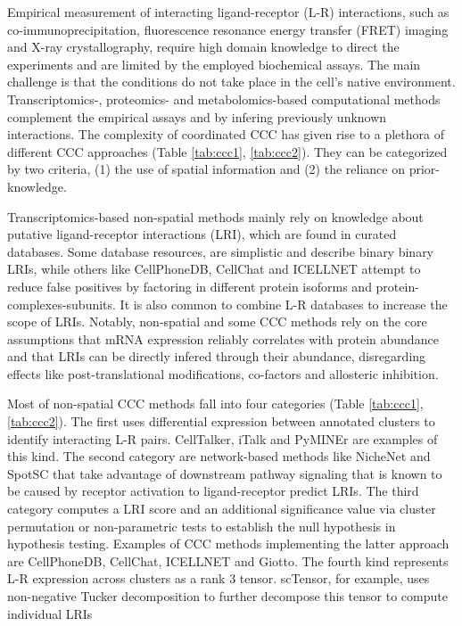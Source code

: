 Empirical measurement of interacting ligand-receptor (L-R) interactions, such as co-immunoprecipitation, fluorescence resonance energy transfer (FRET) imaging
and X-ray crystallography, require high domain knowledge to direct the experiments and are limited by the employed biochemical assays\cite{Armingol-2021}. The main challenge is that the conditions do not take place in the cell's native environment. Transcriptomics-, proteomics- and metabolomics-based computational methods complement the empirical assays and by infering previously unknown interactions. The complexity of coordinated CCC has given rise to a plethora of different CCC approaches (Table \ref{tab:ccc1}, \ref{tab:ccc2}). They can be categorized by two criteria, (1) the use of spatial information and (2) the reliance on prior-knowledge\cite{Almet-2021}\cite{Jin-2022}. 

Transcriptomics-based non-spatial methods mainly rely on knowledge about putative ligand-receptor interactions (LRI), which are found in curated databases. Some database resources, are simplistic and describe binary binary LRIs, while others like CellPhoneDB, CellChat and ICELLNET attempt to reduce false positives by factoring in different protein isoforms and protein-complexes-subunits. It is also common to combine L-R databases to increase the scope of LRIs. Notably, non-spatial and some CCC methods rely on the core assumptions that mRNA expression reliably correlates with protein abundance and that LRIs can be directly infered through their abundance, disregarding effects like post-translational modifications, co-factors and allosteric inhibition.

Most of non-spatial CCC methods fall into four categories (Table \ref{tab:ccc1}, \ref{tab:ccc2})\cite{Armingol-2021}\cite{Almet-2021}\cite{Jin-2022}. The first uses differential expression between annotated clusters to identify interacting L-R pairs. CellTalker, iTalk and PyMINEr are examples of this kind. The second category are network-based methods like NicheNet and SpotSC that take advantage of downstream pathway signaling that is known to be caused by receptor activation to ligand-receptor predict LRIs. The third category computes a LRI score and an additional significance value via cluster permutation or non-parametric tests to establish the null hypothesis in hypothesis testing. Examples of CCC methods implementing the latter approach are CellPhoneDB, CellChat, ICELLNET and Giotto. The fourth kind represents L-R expression across clusters as a rank 3 tensor. scTensor, for example, uses non-negative Tucker decomposition to further decompose this tensor to compute individual LRIs

